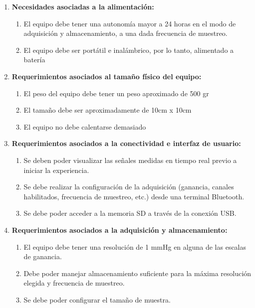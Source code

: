 \begin{enumerate}
	\item \textbf{Necesidades asociadas a la alimentación:} 
	\begin{enumerate}[label*=\arabic*.]
		\item El equipo debe tener una autonomía mayor a 24 horas en el modo de adquisición y almacenamiento, a una dada frecuencia de muestreo.
		\item El equipo debe ser portátil e inalámbrico, por lo tanto, alimentado a batería
	\end{enumerate}
	
	\item \textbf{Requerimientos asociados al tamaño físico del equipo:}
	\begin{enumerate}[label*=\arabic*.]
		\item El peso del equipo debe tener un peso aproximado de 500 gr
		\item El tamaño debe ser aproximadamente de 10cm x 10cm
		\item El equipo no debe calentarse demasiado
	\end{enumerate}
	
	\item \textbf{Requerimientos asociados a la conectividad e interfaz de usuario:}
	
	\begin{enumerate}[label*=\arabic*.]
		\item Se deben poder visualizar las señales medidas en tiempo real previo a iniciar la experiencia.
		\item Se debe realizar la configuración de la adquisición (ganancia, canales habilitados, frecuencia de muestreo, etc.) desde una terminal Bluetooth.
		\item Se debe poder acceder a la memoria SD a través de la conexión USB.
	\end{enumerate}


	\item \textbf{Requerimientos asociados a la adquisición y almacenamiento:}
	
	\begin{enumerate}[label*=\arabic*.]
		\item El equipo debe tener una resolución de 1 mmHg en alguna de las escalas de ganancia.
		\item Debe poder manejar almacenamiento suficiente para la máxima resolución elegida y frecuencia de muestreo.
		\item Se debe poder configurar el tamaño de muestra.
	\end{enumerate}

\end{enumerate}



